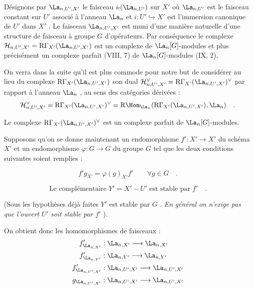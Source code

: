 Désignons par $\La_{n,U',X'}$ le faisceau $i_!(\La_{n,U'})$ sur $X'$ où $\La_{n,U'}$ est le faisceau constant sur $U'$ associé à l'anneau $\La_n$ et $i : U' \hookrightarrow X'$ est l'immersion canonique de $U'$ dans $X'$ . Le faisceau $\La_{n,U',X'}$ est muni d'une manière naturelle d'une structure de faisceau à groupe $G$ d'opérateurs. Par conséquence le complexe $\mathcal{H}_{n,U',X'} = \mathrm{R}\Gamma_{X'}(\La_{n,U',X'})$ est un complexe de $\La_n[G]$-modules
et plus précisément un complexe parfait (VIII, 7) de $\La_n[G]$-modules (IX, 2).

On verra dans la suite qu'il est plus commode pour notre but de considérer au lieu du complexe $\mathrm{R}\Gamma_{X'}(\La_{n,U',X'})$ son dual $\mathcal{H}_{n,U',X'}^\vee = \mathrm{R}\Gamma_{X'}(\La_{n,U',X'})^\vee$ par rapport à l'anneau $\La_n$ , au sens des catégories dérivées :
\[
\mathcal{H}_{n,U',X'}^\vee = \mathrm{R}\Gamma_{X'}(\La_{n,U',X'})^\vee = \mathrm{R}\Hom_{\La_n}(\mathrm{R}\Gamma_{X'}(\La_{n,U',X'}), \La_n) \quad .
\]

Le complexe $\mathrm{R}\Gamma_{X'}(\La_{n,U',X'})^\vee$ est un complexe parfait de $\La_n[G]$-modules.

Supposons qu'on se donne maintenant un endomorphisme $f' : X' \to X'$ du schéma $X'$ et un endomorphisme $\varphi : G \to G$ du groupe $G$ tel que les deux conditions suivantes soient remplies :

\begin{equation}\tag{1.1}
f' g_{X'} = \varphi(g)_{X'} f' \qquad \forall g \in G \quad .
\end{equation}

\begin{equation}\tag{1.2}
\text{Le complémentaire } Y' = X' - U' \text{ est stable par } f' \quad .
\end{equation}

(Sous les hypothèses déjà faites $Y'$ est stable par $G$ . \emph{En général on n'exige pas que l'ouvert $U'$ soit stable par $f'$} ).

On obtient donc les homomorphismes de faisceaux :
\begin{align*}
f'_{\La_{n,X'}} &: \La_{n,X'} \longrightarrow \La_{n,X'} \\
f'_{\La_{n,Y'}} &: \La_{n,Y'} \longrightarrow \La_{n,Y'} \\
f'_{\La_{n,U',X'}} &: \La_{n,U',X'} \longrightarrow \La_{n,U',X'} \\
g_{\La_{n,U',X'}} &: \La_{n,U',X'} \longrightarrow \La_{n,U',X'}
\end{align*}

